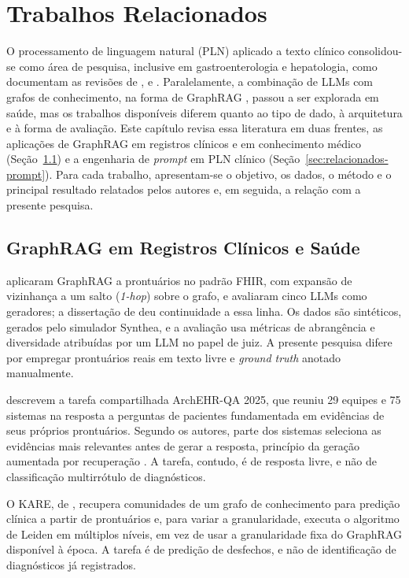 \chapter{Trabalhos Relacionados}\label{cap:relacionados}

O processamento de linguagem natural (PLN) aplicado a texto clínico consolidou-se como área de pesquisa, inclusive em gastroenterologia e hepatologia, como documentam as revisões de \citet{hou2014}, \citet{stammers2025} e \citet{omar2025}. Paralelamente, a combinação de LLMs com grafos de conhecimento, na forma de GraphRAG \citep{edge2024}, passou a ser explorada em saúde, mas os trabalhos disponíveis diferem quanto ao tipo de dado, à arquitetura e à forma de avaliação. Este capítulo revisa essa literatura em duas frentes, as aplicações de GraphRAG em registros clínicos e em conhecimento médico (Seção~\ref{sec:relacionados-graphrag-saude}) e a engenharia de \textit{prompt} em PLN clínico (Seção~\ref{sec:relacionados-prompt}). Para cada trabalho, apresentam-se o objetivo, os dados, o método e o principal resultado relatados pelos autores e, em seguida, a relação com a presente pesquisa.

\section{GraphRAG em Registros Clínicos e Saúde}\label{sec:relacionados-graphrag-saude}

\citet{baptista2025} aplicaram GraphRAG a prontuários no padrão FHIR, com expansão de vizinhança a um salto (\textit{1-hop}) sobre o grafo, e avaliaram cinco LLMs como geradores; a dissertação de \citet{baptista2026} deu continuidade a essa linha. Os dados são sintéticos, gerados pelo simulador Synthea, e a avaliação usa métricas de abrangência e diversidade atribuídas por um LLM no papel de juiz. A presente pesquisa difere por empregar prontuários reais em texto livre e \textit{ground truth} anotado manualmente.

\citet{soni2025} descrevem a tarefa compartilhada ArchEHR-QA 2025, que reuniu 29 equipes e 75 sistemas na resposta a perguntas de pacientes fundamentada em evidências de seus próprios prontuários. Segundo os autores, parte dos sistemas seleciona as evidências mais relevantes antes de gerar a resposta, princípio da geração aumentada por recuperação \citep{lewis2020}. A tarefa, contudo, é de resposta livre, e não de classificação multirrótulo de diagnósticos.

O KARE, de \citet{kare2025}, recupera comunidades de um grafo de conhecimento para predição clínica a partir de prontuários e, para variar a granularidade, executa o algoritmo de Leiden em múltiplos níveis, em vez de usar a granularidade fixa do GraphRAG disponível à época. A tarefa é de predição de desfechos, e não de identificação de diagnósticos já registrados.

